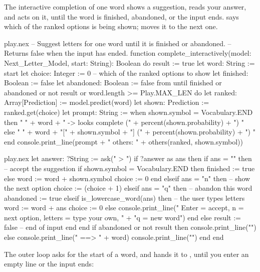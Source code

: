 \documentclass[11pt,a4paper,oneside,openany]{book}
\newcommand{\code}[1]{\texttt{\detokenize{#1}}}
\begin{document}
The interactive completion of one word shows a suggestion, reads your
answer, and acts on it, until the word is finished, abandoned, or the
input ends. \code{choice} says which of the ranked options is being
shown; \code{n} moves it to the next one.

\begin{append}{play.nex}
-- Suggest letters for one word until it is finished or abandoned.
-- Returns false when the input has ended.
function complete_interactively(model: Next_Letter_Model,
  start: String): Boolean do
  result := true
  let word: String := start
  let choice: Integer := 0     -- which of the ranked options to show
  let finished: Boolean := false
  let abandoned: Boolean := false
  from
  until
    finished or abandoned or not result or word.length >= Play.MAX_LEN
  do
    let ranked: Array[Prediction] := model.predict(word)
    let shown: Prediction := ranked.get(choice)
    let prompt: String := when shown.symbol = Vocabulary.END then
      "  " + word + "   -> looks complete (" + percent(shown.probability) + ")   "
    else
      "  " + word + "[" + shown.symbol + "]   (" + percent(shown.probability) + ")   "
    end
    console.print_line(prompt + "   others: " + others(ranked, shown.symbol))
\end{append}

\begin{continued}{play.nex}
    let answer: ?String := ask("  > ")
    if ?answer as ans then
      if ans = "" then                          -- accept the suggestion
        if shown.symbol = Vocabulary.END then
          finished := true
        else
          word := word + shown.symbol
          choice := 0
        end
      elseif ans = "n" then                     -- show the next option
        choice := (choice + 1) %
      elseif ans = "q" then                     -- abandon this word
        abandoned := true
      elseif is_lowercase_word(ans) then        -- the user types letters
        word := word + ans
        choice := 0
      else
        console.print_line("  Enter = accept, n = next option, letters = type your own, "
          + "q = new word")
      end
    else
      result := false                           -- end of input
    end
  end
  if abandoned or not result then
    console.print_line("")
  else
    console.print_line("  ==> " + word)
    console.print_line("")
  end
end
\end{continued}

The outer loop asks for the start of a word, and hands it to
\code{complete_interactively}, until you enter an empty line or the input
ends:
\end{document}
